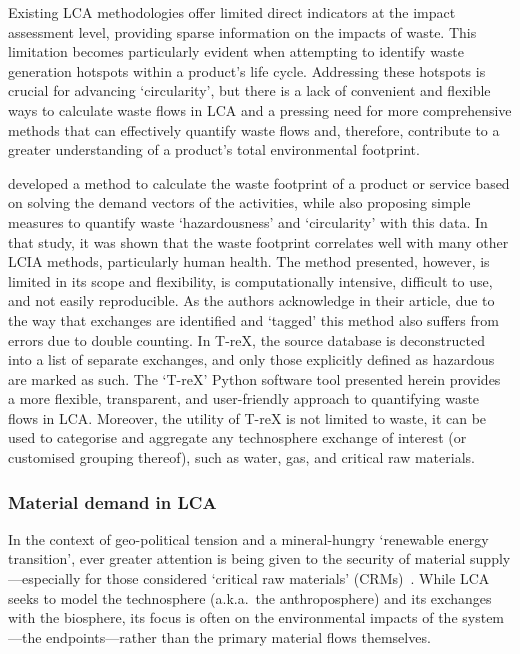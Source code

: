 Existing LCA methodologies offer limited direct indicators at the impact assessment level, providing sparse information on the impacts of waste. This limitation becomes particularly evident when attempting to identify waste generation hotspots within a product's life cycle. Addressing these hotspots is crucial for advancing `circularity', but there is a lack of convenient and flexible ways to calculate waste flows in LCA and a pressing need for more comprehensive methods that can effectively quantify waste flows and, therefore, contribute to a greater understanding of a product's total environmental footprint.

\cite{laurenti2023wastefootprint} developed a method to calculate the waste footprint of a product or service based on solving the demand vectors of the activities, while also proposing simple measures to quantify waste `hazardousness' and `circularity' with this data. In that study, it was shown that the waste footprint correlates well with many other LCIA methods, particularly human health. The method presented, however, is limited in its scope and flexibility, is computationally intensive, difficult to use, and not easily reproducible. As the authors acknowledge in their article, due to the way that exchanges are identified and `tagged' this method also suffers from errors due to double counting.  In T-reX, the source database is deconstructed into a list of separate exchanges, and only those explicitly defined as hazardous are marked as such. The `T-reX' Python software tool presented herein provides a more flexible, transparent, and user-friendly approach to quantifying waste flows in LCA\@. Moreover, the utility of T-reX is not limited to waste, it can be used to categorise and aggregate any technosphere exchange of interest (or customised grouping thereof), such as water, gas, and critical raw materials.

\subsubsection{Material demand in LCA}\label{sec:intro-material}

In the context of geo-political tension and a mineral-hungry `renewable energy transition', ever greater attention is being given to the security of material supply---especially for those considered `critical raw materials' (CRMs)~\citep{eu2023crmstudy,hool2023crm,mancini2013supplysecurity,jrc2023supplychain,hartley2024cepolitics,salviulo2021supplychain,iea2023crm,iea2023energytechperspectives}. While LCA seeks to model the technosphere (a.k.a.\ the anthroposphere) and its exchanges with the biosphere, its focus is often on the environmental impacts of the system---the endpoints---rather than the primary material flows themselves.

